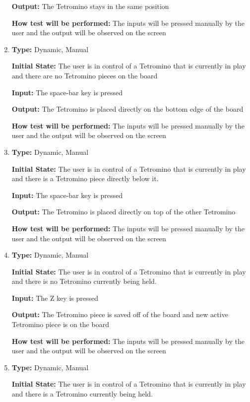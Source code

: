 \documentclass[12pt, titlepage]{article}
\begin{document}
\begin{enumerate}[{FR-CI-}1. ]
		\textbf{Output:} The Tetromino stays in the same position
		
		\textbf{How test will be performed:} The inputs will be pressed manually by the user and the output will be observed on the screen
		
		\item
		\textbf{Type:} Dynamic, Manual
		
		\textbf{Initial State:} The user is in control of a Tetromino that is currently in play and there are no Tetromino pieces on the board
		
		\textbf{Input:} The space-bar key is pressed 
		
		\textbf{Output:} The Tetromino is placed directly on the bottom edge of the board
		
		\textbf{How test will be performed:} The inputs will be pressed manually by the user and the output will be observed on the screen
		
		\item
		\textbf{Type:} Dynamic, Manual
		
		\textbf{Initial State:} The user is in control of a Tetromino that is currently in play and there is a Tetromino piece directly below it.
		
		\textbf{Input:} The space-bar key is pressed 
		
		\textbf{Output:} The Tetromino is placed directly on top of the other Tetromino
		
		\textbf{How test will be performed:} The inputs will be pressed manually by the user and the output will be observed on the screen
		
		\item
		\textbf{Type:} Dynamic, Manual
		
		\textbf{Initial State:} The user is in control of a Tetromino that is currently in play and there is no Tetromino currently being held.
		
		\textbf{Input:} The Z key is pressed 
		
		\textbf{Output:} The Tetromino piece is saved off of the board and new active Tetromino piece is on the board 
		
		\textbf{How test will be performed:} The inputs will be pressed manually by the user and the output will be observed on the screen
		
		\item
		\textbf{Type:} Dynamic, Manual
		
		\textbf{Initial State:} The user is in control of a Tetromino that is currently in play and there is a Tetromino currently being held.
		

\end{enumerate}
\end{document}

